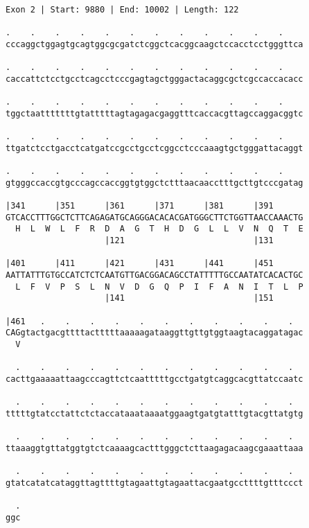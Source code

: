 \documentclass{article}
\begin{document}
\begin{Verbatim}[fontfamily=courier]
Exon 2 | Start: 9880 | End: 10002 | Length: 122

.    .    .    .    .    .    .    .    .    .    .    .    
cccaggctggagtgcagtggcgcgatctcggctcacggcaagctccacctcctgggttca

.    .    .    .    .    .    .    .    .    .    .    .    
caccattctcctgcctcagcctcccgagtagctgggactacaggcgctcgccaccacacc

.    .    .    .    .    .    .    .    .    .    .    .    
tggctaatttttttgtatttttagtagagacgaggtttcaccacgttagccaggacggtc

.    .    .    .    .    .    .    .    .    .    .    .    
ttgatctcctgacctcatgatccgcctgcctcggcctcccaaagtgctgggattacaggt

.    .    .    .    .    .    .    .    .    .    .    .    
gtgggccaccgtgcccagccaccggtgtggctctttaacaacctttgcttgtcccgatag

|341      |351      |361      |371      |381      |391      
GTCACCTTTGGCTCTTCAGAGATGCAGGGACACACGATGGGCTTCTGGTTAACCAAACTG
  H  L  W  L  F  R  D  A  G  T  H  D  G  L  L  V  N  Q  T  E
                    |121                          |131      

|401      |411      |421      |431      |441      |451      
AATTATTTGTGCCATCTCTCAATGTTGACGGACAGCCTATTTTTGCCAATATCACACTGC
  L  F  V  P  S  L  N  V  D  G  Q  P  I  F  A  N  I  T  L  P
                    |141                          |151      

|461   .    .    .    .    .    .    .    .    .    .    .  
CAGgtactgacgttttactttttaaaaagataaggttgttgtggtaagtacaggatagac
  V                                                         

  .    .    .    .    .    .    .    .    .    .    .    .  
cacttgaaaaattaagcccagttctcaatttttgcctgatgtcaggcacgttatccaatc

  .    .    .    .    .    .    .    .    .    .    .    .  
tttttgtatcctattctctaccataaataaaatggaagtgatgtatttgtacgttatgtg

  .    .    .    .    .    .    .    .    .    .    .    .  
ttaaaggtgttatggtgtctcaaaagcactttgggctcttaagagacaagcgaaattaaa

  .    .    .    .    .    .    .    .    .    .    .    .  
gtatcatatcataggttagttttgtagaattgtagaattacgaatgccttttgtttccct

  .
ggc
\end{Verbatim}
\newpage
\end{document}
